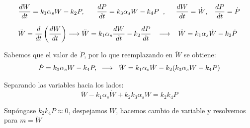 \begin{equation*}
    \frac{dW}{dt} = k_{1}\alpha_{s}W - k_{2}P, \hspace{0.6cm} \frac{dP}{dt} = k_{3}\alpha_{s}W - k_{4}P \hspace{0.2cm}, \hspace{0.3cm} \hspace{0.2cm} \frac{dW}{dt} = \dot{W}, \hspace{0.3cm} \frac{dP}{dt} = \dot{P}
\end{equation*}


\begin{equation*}
    \ddot{W} = \frac{d}{dt}\left(\frac{dW}{dt}\right) \longrightarrow \ddot{W} = k_{1}\alpha_{s}\frac{dW}{dt} - k_{2}\frac{dP}{dt} \hspace{0.3cm} \longrightarrow \hspace{0.3cm} \ddot{W} = k_{1}\alpha_{s}\dot{W} - k_{2}\dot{P}\hspace{0.15cm}
\end{equation*}

Sabemos que el valor de $\dot{P}$, por lo que reemplazando en $\ddot{W}$ se obtiene:
\begin{equation*}
    \dot{P} = k_{3}\alpha_{s}W - k_{4}P, \hspace{0.2cm}\longrightarrow\hspace{0.2cm} \ddot{W} = k_{1}\alpha_{s}\dot{W} - k_{2}(k_{3}\alpha_{s}W - k_{4}P)
\end{equation*}

Separando las variables hacia los lados:
\begin{equation}
    \ddot{W}- k_{1}\alpha_{s}\dot{W} + k_{2}k_{3}\alpha_{s}W = k_{2}k_{4}P
\end{equation}

Supóngase  $k_{2}k_{4}P\approx 0$, despejamos $\ddot{W}$, hacemos cambio de variable y resolvemos para $m = \ddot{W}$


